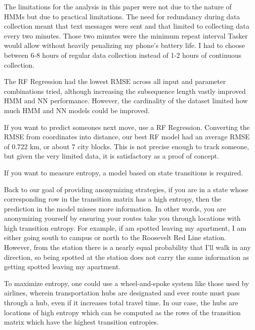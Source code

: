 \documentclass[11pt]{amsart}
\begin{document}

The limitations for the analysis in this paper were not due to the nature of HMMs but due to practical limitations.
The need for redundancy during data collection meant that text messages were sent and that limited to collecting data every two minutes.
Those two minutes were the minimum repeat interval Tasker would allow without heavily penalizing my phone's battery life.
I had to choose between 6-8 hours of regular data collection instead of 1-2 hours of continuous collection.

The RF Regression had the lowest RMSE across all input and parameter combinations tried, although increasing the subsequence length vastly improved HMM and NN performance.
However, the cardinality of the dataset limited how much HMM and NN models could be improved.

If you want to predict someones next move, use a RF Regression.
Converting the RMSE from coordinates into distance, our best RF model had an average RMSE of 0.722 km, or about 7 city blocks.
This is not precise enough to track someone, but given the very limited data, it is satisfactory as a proof of concept.

If you want to measure entropy, a model based on state transitions is required.

Back to our goal of providing anonymizing strategies, if you are in a state whose corresponding row in the transition matrix has a high entropy, then the prediction in the model misses more information.
In other words, you are anonymizing yourself by ensuring your routes take you through locations with high transition entropy.
For example, if am spotted leaving my apartment, I am either going south to campus or north to the Roosevelt Red Line station.
However, from the station there is a nearly equal probability that I'll walk in any direction, so being spotted at the station does not carry the same information as getting spotted leaving my apartment.

To maximize entropy, one could use a wheel-and-spoke system like those used by airlines, wherein transportation hubs are designated and ever route must pass through a hub, even if it increases total travel time.
In our case, the hubs are locations of high entropy which can be computed as the rows of the transition matrix which have the highest transition entropies.
\end{document}
